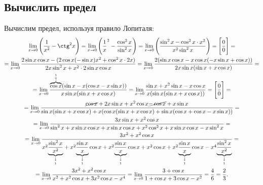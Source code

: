 \documentclass{article}
\newcommand{\mysection}[3]{\setcounter{section}{#1}\setcounter{subsection}{#2}\addtocounter{subsection}{-1}\subsection{#3}}
\begin{document}
\clearpage
\mysection{5}{7}{Вычислить предел}
Вычислим предел, используя правило Лопиталя:
\begin{multline*}
\lim\limits_{x \to 0}\Bigg(\dfrac{1}{x^2}-\ctg^2 x\Bigg) = \lim\limits_{x \to 0}\Bigg(\dfrac 1 x^2 - \dfrac{\cos^2 x}{\sin^2 x}\Bigg) = \lim\limits_{x \to 0}\Bigg(\dfrac{\sin^2 x - \cos^2 x \cdot x^2}{x^2\sin^2 x}\Bigg) = \Bigg[\dfrac 0 0\Bigg] =\\
= \lim\limits_{x \to 0}\dfrac{2\sin x \cos x - (2\cos x(-\sin x)x^2 + \cos^2 x \cdot 2x)}{2x\sin^2 x + x^2 \cdot 2 \sin x \cos x}
= \lim\limits_{x \to 0}\dfrac{2(\sin x \cos x - x \cos x(-x\sin x + \cos x))}{2x\sin x(\sin x + x \cos x)} =\\
= \lim\limits_{x \to 0}\dfrac{\overset{\overset 1 \uparrow}{\overbrace{\cos x}}(\sin x - x(\cos x - x\sin x))}{x\sin x(\sin x + x \cos x)} = \lim\limits_{x \to 0}\dfrac{\sin x + x^2\sin x - x\cos x}{x(\sin x(\sin x + x \cos x))} = \Bigg[\dfrac 0 0\Bigg] =\\
= \lim\limits_{x \to 0}\dfrac{\cancel{\cos x} + 2x\sin x + x^2 \cos x \cancel{- \cos x} + x \sin x}{\sin x(\sin x + x \cos x) + x(\cos x(\sin x + x \cos x) + \sin x(\cos x + \cos x - x\sin x))} = \\
= \lim\limits_{x \to 0}\dfrac{3x\sin x + x^2 \cos x}{\sin^2 x + x \sin x \cos x + x \sin x \cos x + x^2 \cos^2 x + x \sin x \cos x - x \sin^2 x} =\\
= \lim\limits_{x \to 0}\dfrac{3x^2 + x^2\cos x}
{x^2 \underset{\underset 1 \downarrow}{\underbrace{\dfrac{\sin^2 x}{x^2}}}
+ x^2 \underset{\underset 1 \downarrow}{\underbrace{\dfrac{\sin x}{x}}} \cos x
+ x^2 \underset{\underset 1 \downarrow}{\underbrace{\dfrac{\sin x}{x}}} \cos x
+ x^2 \cos x + x^2 \underset{\underset 1 \downarrow}{\underbrace{\dfrac{\sin x}{x}}} \cos x
- x^4 \underset{\underset 1 \downarrow}{\underbrace{\dfrac{\sin^2 x}{x^2}}}} =\\
= \lim\limits_{x \to 0}\dfrac{3x^2 + x^2\cos x}{x^2 + x^2\cos x + 3x^2\cos x - x^4} = \lim\limits_{x \to 0}\dfrac{3+\cos x}{1 + \cos x + 3 \cos x - x^2} = \dfrac 4 6 = \dfrac 2 3.
\end{multline*}
\end{document}
